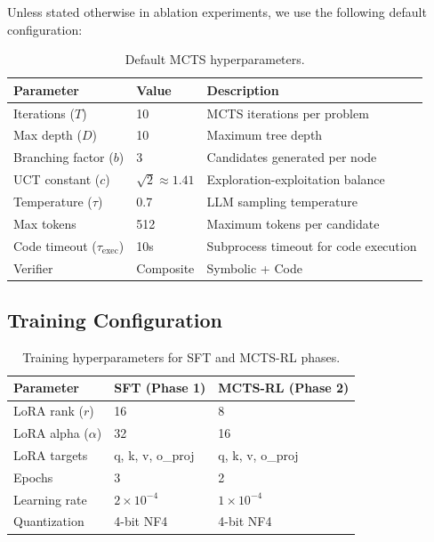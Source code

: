 \documentclass[11pt,a4paper]{article}
\begin{document}
Unless stated otherwise in ablation experiments, we use the following default
configuration:

\begin{table}[h]
\centering
\caption{Default MCTS hyperparameters.}
\label{tab:mcts_defaults}
\begin{tabular}{lll}
\toprule
\textbf{Parameter} & \textbf{Value} & \textbf{Description} \\
\midrule
Iterations ($T$) & 10 & MCTS iterations per problem \\
Max depth ($D$) & 10 & Maximum tree depth \\
Branching factor ($b$) & 3 & Candidates generated per node \\
UCT constant ($c$) & $\sqrt{2} \approx 1.41$ & Exploration-exploitation balance \\
Temperature ($\tau$) & 0.7 & LLM sampling temperature \\
Max tokens & 512 & Maximum tokens per candidate \\
Code timeout ($\tau_{\text{exec}}$) & 10s & Subprocess timeout for code execution \\
Verifier & Composite & Symbolic + Code \\
\bottomrule
\end{tabular}
\end{table}

\subsection{Training Configuration}

\begin{table}[h]
\centering
\caption{Training hyperparameters for SFT and MCTS-RL phases.}
\label{tab:training_config}
\begin{tabular}{lll}
\toprule
\textbf{Parameter} & \textbf{SFT (Phase 1)} & \textbf{MCTS-RL (Phase 2)} \\
\midrule
LoRA rank ($r$) & 16 & 8 \\
LoRA alpha ($\alpha$) & 32 & 16 \\
LoRA targets & q, k, v, o\_proj & q, k, v, o\_proj \\
Epochs & 3 & 2 \\
Learning rate & $2 \times 10^{-4}$ & $1 \times 10^{-4}$ \\
Quantization & 4-bit NF4 & 4-bit NF4 \\
\bottomrule
\end{tabular}
\end{table}
\end{document}
